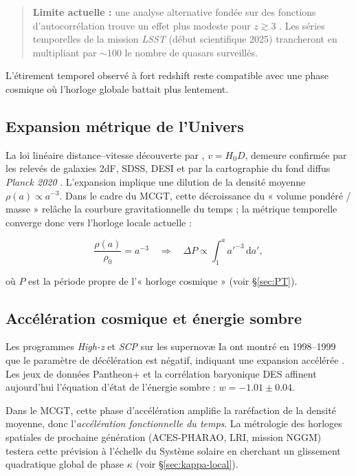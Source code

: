 \documentclass[11pt]{article}
\begin{document}
\begin{quote}\small
\textbf{Limite actuelle :} une analyse alternative fondée sur des fonctions
d’autocorrélation trouve un effet plus modeste pour \(z\gtrsim3\)
\parencite{Zheng2023}.  
Les séries temporelles de la mission \emph{LSST} (début scientifique 2025)
trancheront en multipliant par \(\sim100\) le nombre de quasars surveillés.
\end{quote}

L’étirement temporel observé à fort redshift reste compatible avec une phase
cosmique où l’horloge globale battait plus lentement.

\subsection{Expansion métrique de l’Univers}

La loi linéaire distance–vitesse découverte par \textcite{Hubble1929},
\(v = H_{0}D\), demeure confirmée par les relevés de galaxies
2dF, SDSS, DESI et par la cartographie du fond diffus
\emph{Planck 2020} \parencite{Planck2020}.  
L’expansion implique une dilution de la densité moyenne
\(\rho(a)\propto a^{-3}\).  
Dans le cadre du MCGT, cette décroissance du « volume pondéré / masse »
relâche la courbure gravitationnelle du temps ; la métrique temporelle
converge donc vers l’horloge locale actuelle :

\[
\frac{\rho(a)}{\rho_{0}}=a^{-3}
\quad\Longrightarrow\quad
\Delta P \propto
\displaystyle\int_{1}^{a} a'^{-3}\,\mathrm d a',
\]

où \(P\) est la période propre de l’« horloge cosmique » (voir
\S\ref{sec:PT}).

\subsection{Accélération cosmique et énergie sombre}

Les programmes \emph{High-z} et \emph{SCP} sur les supernovæ Ia ont
montré en 1998–1999 que le paramètre de décélération est négatif,
indiquant une expansion accélérée
\parencite{Riess1998,Perlmutter1999}.  
Les jeux de données Pantheon+ \parencite{Brout2022} et la corrélation
baryonique DES \parencite{DES2022} affinent aujourd’hui l’équation
d’état de l’énergie sombre : \(w = -1.01 \pm 0.04\).

\medskip
Dans le MCGT, cette phase d’accélération amplifie la raréfaction de la
densité moyenne, donc l’\emph{accélération fonctionnelle du temps}.
La métrologie des horloges spatiales de prochaine génération
(ACES-PHARAO, LRI, mission NGGM) testera cette prévision à l’échelle du
Système solaire en cherchant un glissement quadratique global de phase
\(\kappa\) (voir \S\ref{sec:kappa-local}).
\end{document}
